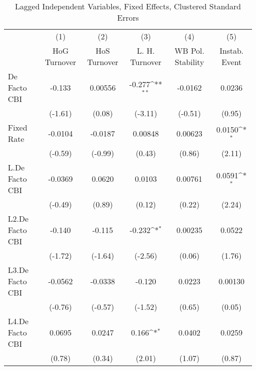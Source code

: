 {
\def\sym#1{\ifmmode^{#1}\else\(^{#1}\)\fi}
\begin{longtable}{l*{5}{c}}
\caption{Lagged Independent Variables, Fixed Effects, Clustered Standard Errors \label{lagsDF}}\\
\hline\hline\endfirsthead\hline\endhead\hline\endfoot\endlastfoot
                &\multicolumn{1}{c}{(1)}&\multicolumn{1}{c}{(2)}&\multicolumn{1}{c}{(3)}&\multicolumn{1}{c}{(4)}&\multicolumn{1}{c}{(5)}\\
                &\multicolumn{1}{c}{HoG Turnover}&\multicolumn{1}{c}{HoS Turnover}&\multicolumn{1}{c}{L. H. Turnover}&\multicolumn{1}{c}{WB Pol. Stability}&\multicolumn{1}{c}{Instab. Event}\\
\hline
De Facto CBI    &   -0.133         &  0.00556         &   -0.277\sym{**} &  -0.0162         &   0.0236         \\
                &  (-1.61)         &   (0.08)         &  (-3.11)         &  (-0.51)         &   (0.95)         \\
[1em]
Fixed Rate      &  -0.0104         &  -0.0187         &  0.00848         &  0.00623         &   0.0150\sym{*}  \\
                &  (-0.59)         &  (-0.99)         &   (0.43)         &   (0.86)         &   (2.11)         \\
[1em]
L.De Facto CBI  &  -0.0369         &   0.0620         &   0.0103         &  0.00761         &   0.0591\sym{*}  \\
                &  (-0.49)         &   (0.89)         &   (0.12)         &   (0.22)         &   (2.24)         \\
[1em]
L2.De Facto CBI &   -0.140         &   -0.115         &   -0.232\sym{*}  &  0.00235         &   0.0522         \\
                &  (-1.72)         &  (-1.64)         &  (-2.56)         &   (0.06)         &   (1.76)         \\
[1em]
L3.De Facto CBI &  -0.0562         &  -0.0338         &   -0.120         &   0.0223         &  0.00130         \\
                &  (-0.76)         &  (-0.57)         &  (-1.52)         &   (0.65)         &   (0.05)         \\
[1em]
L4.De Facto CBI &   0.0695         &   0.0247         &    0.166\sym{*}  &   0.0402         &   0.0259         \\
                &   (0.78)         &   (0.34)         &   (2.01)         &   (1.07)         &   (0.87)         \\

\end{longtable}}
